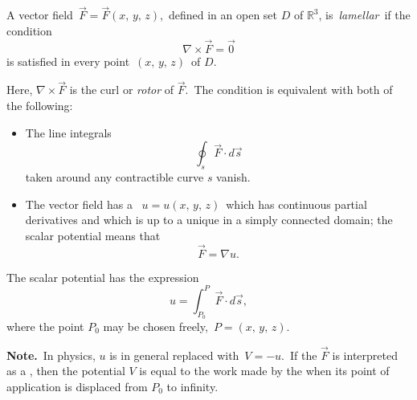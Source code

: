 \documentclass[12pt]{article}
\begin{document}
A vector field \,$\vec{F} = \vec{F}(x,\,y,\,z)$,\, defined in an open set $D$ of $\mathbb{R}^3$, is\, {\em lamellar}\, if the condition 
                   $$\nabla\!\times\!\vec{F} = \vec{0}$$
is satisfied in every point \,$(x,\,y,\,z)$\, of $D$.

Here, $\nabla\!\times\!\vec{F}$ is the curl or {\em rotor} of $\vec{F}$.\, The condition is equivalent with both of the following:
\begin{itemize}
\item The line integrals 
                $$\oint_s \vec{F}\cdot d\vec{s}$$
taken around any  contractible curve $s$ vanish.
\item The vector field has a \, $u = u(x,\,y,\,z)$\, which has continuous partial derivatives and which is up to a  unique in a simply connected domain; the scalar potential means that
                      $$\vec{F} = \nabla u.$$
\end{itemize}
The scalar potential has the expression
$$u = \int_{P_0}^P\vec{F}\cdot d\vec{s},$$
where the point $P_0$ may be chosen freely,\, $P = (x,\,y,\,z)$.

\textbf{Note.}\, In physics, $u$ is in general replaced with\, $V = -u$.\, If the $\vec{F}$ is interpreted as a , then the potential $V$ is equal to the work made by the  when its point of application is displaced from $P_0$ to infinity.
\end{document}
